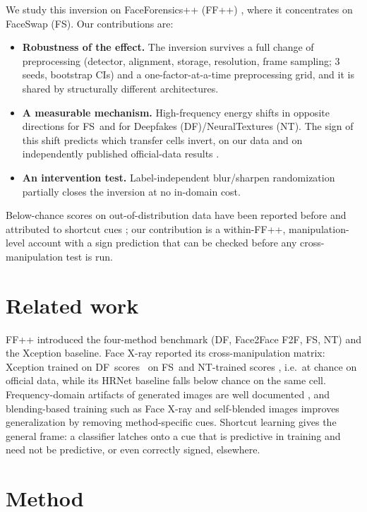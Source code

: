 \documentclass[conference]{IEEEtran}
\newcommand{\DF}{DF}
\newcommand{\FF}{F2F}
\newcommand{\FS}{FS}
\newcommand{\NT}{NT}
\begin{document}
We study this inversion on FaceForensics++ (FF++) \cite{rossler2019ffpp},
where it concentrates on FaceSwap (\FS). Our contributions are:
\begin{itemize}
\item \textbf{Robustness of the effect.} The inversion survives a full change
of preprocessing (detector, alignment, storage, resolution, frame sampling;
3 seeds, bootstrap CIs) and a one-factor-at-a-time preprocessing grid, and
it is shared by structurally different architectures.
\item \textbf{A measurable mechanism.} High-frequency energy shifts in
opposite directions for \FS\ and for Deepfakes (\DF)/NeuralTextures (\NT).
The sign of this shift predicts which transfer cells invert, on our data and
on independently published official-data results \cite{li2020facexray}.
\item \textbf{An intervention test.} Label-independent blur/sharpen
randomization partially closes the inversion at no in-domain cost.
\end{itemize}
Below-chance scores on out-of-distribution data have been reported before and
attributed to shortcut cues \cite{geirhos2020shortcut,yan2024df40}; our
contribution is a within-FF++, manipulation-level account with a sign
prediction that can be checked before any cross-manipulation test is run.

\section{Related work}

FF++ \cite{rossler2019ffpp} introduced the four-method benchmark (\DF,
Face2Face \FF, \FS, \NT) and the Xception \cite{chollet2017xception}
baseline. Face X-ray \cite{li2020facexray} reported its cross-manipulation
matrix: Xception trained on \DF\ scores \pubdffs\ on \FS\ and \NT-trained
scores \pubntfs, i.e.\ at chance on official data, while its HRNet baseline
falls below chance on the same cell. Frequency-domain artifacts of generated
images are well documented \cite{durall2020upconv,frank2020frequency}, and
blending-based training such as Face X-ray and self-blended images
\cite{shiohara2022sbi} improves generalization by removing method-specific
cues. Shortcut learning \cite{geirhos2020shortcut} gives the general frame:
a classifier latches onto a cue that is predictive in training and need not be
predictive, or even correctly signed, elsewhere.

\section{Method}
\end{document}
